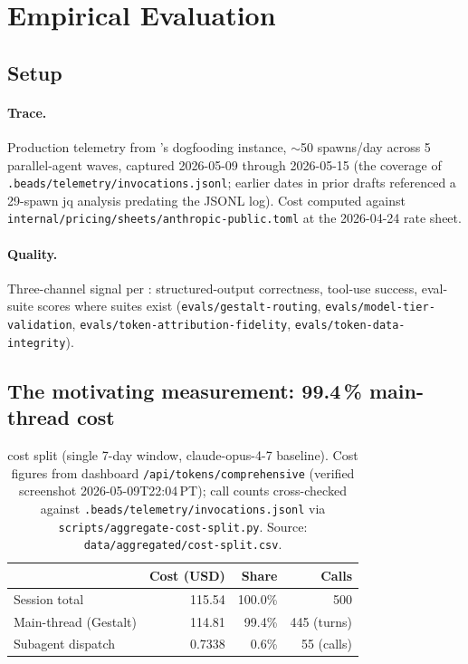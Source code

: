\section{Empirical Evaluation}
\label{sec:eval}

\subsection{Setup}

\paragraph{Trace.}
Production telemetry from \blackrim's dogfooding instance,
\(\sim\)50 spawns/day across 5 parallel-agent waves, captured
2026-05-09 through 2026-05-15 (the coverage of
\texttt{.beads/telemetry/invocations.jsonl}; earlier dates in
prior drafts referenced a 29-spawn jq analysis predating the
JSONL log). Cost computed against
\texttt{internal/pricing/sheets/anthropic-public.toml} at the
2026-04-24 rate sheet.

\paragraph{Quality.}
Three-channel signal per \cite{moa1landscape}: structured-output
correctness, tool-use success, eval-suite scores where suites
exist (\texttt{evals/gestalt-routing}, \texttt{evals/model-tier-validation},
\texttt{evals/token-attribution-fidelity}, \texttt{evals/token-data-integrity}).

\subsection{The motivating measurement: 99.4\,\% main-thread cost}

\begin{table}[h]
\centering
\caption{\blackrim cost split (single 7-day window, claude-opus-4-7 baseline).
  Cost figures from dashboard \texttt{/api/tokens/comprehensive} (verified screenshot
  2026-05-09T22:04\,PT); call counts cross-checked against
  \texttt{.beads/telemetry/invocations.jsonl} via
  \texttt{scripts/aggregate-cost-split.py}.
  Source: \texttt{data/aggregated/cost-split.csv}.}
\label{tab:cost-split}
\begin{tabular}{lrrr}
\toprule
              & Cost (USD) & Share & Calls \\
\midrule
Session total & 115.54 & 100.0\% & 500 \\
Main-thread (Gestalt) & 114.81 & 99.4\% & 445 (turns) \\
Subagent dispatch & 0.7338 & 0.6\% & 55 (calls) \\
\bottomrule
\end{tabular}
\end{table}

